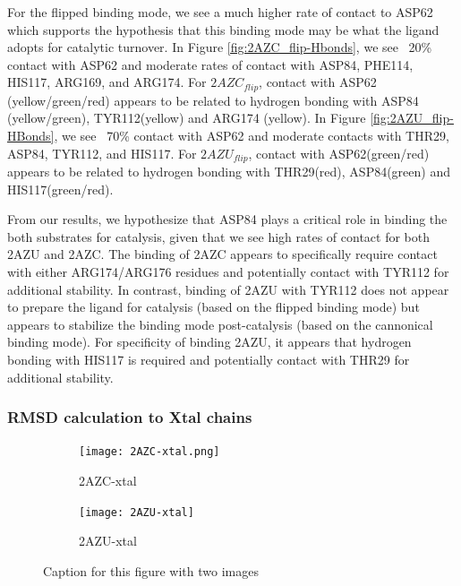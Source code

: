 \documentclass[fleqn,10pt]{wlscirep}
\begin{document}
For the flipped binding mode, we see a much higher rate of contact to ASP62 which supports the hypothesis that this binding mode may be what the ligand adopts for catalytic turnover.
In Figure \ref{fig:2AZC_flip-Hbonds}, we see ~20\% contact with ASP62 and moderate rates of contact with ASP84, PHE114, HIS117, ARG169, and ARG174.
For $2AZC_{flip}$, contact with ASP62 (yellow/green/red) appears to be related to hydrogen bonding with ASP84 (yellow/green), TYR112(yellow) and ARG174 (yellow).
In Figure \ref{fig:2AZU_flip-HBonds}, we see ~70\% contact with ASP62 and moderate contacts with THR29, ASP84, TYR112, and HIS117.
For $2AZU_{flip}$, contact with ASP62(green/red) appears to be related to hydrogen bonding with THR29(red), ASP84(green) and HIS117(green/red).

From our results, we hypothesize that ASP84 plays a critical role in binding the both substrates for catalysis, given that we see high rates of contact for both 2AZU and 2AZC.
The binding of 2AZC appears to specifically require contact with either ARG174/ARG176 residues and potentially contact with TYR112 for additional stability.
In contrast, binding of 2AZU with TYR112 does not appear to prepare the ligand for catalysis (based on the flipped binding mode) but appears to stabilize the binding mode post-catalysis (based on the cannonical binding mode).
For specificity of binding 2AZU, it appears that hydrogen bonding with HIS117 is required and potentially contact with THR29 for additional stability.

\subsubsection{RMSD calculation to Xtal chains}
\begin{figure}[!ht]

\centering
\begin{subfigure}{.5\textwidth}
  \centering
  \texttt{[image: 2AZC-xtal.png]}
  \caption{2AZC-xtal}
  \label{fig:2AZC-xtal}
\end{subfigure}%
\begin{subfigure}{.5\textwidth}
  \centering
  \texttt{[image: 2AZU-xtal]}
  \caption{2AZU-xtal}
  \label{fig:2AZU-xtal}
\end{subfigure}
\caption{Caption for this figure with two images}
\label{fig:xtal}
\end{figure}
\end{document}
